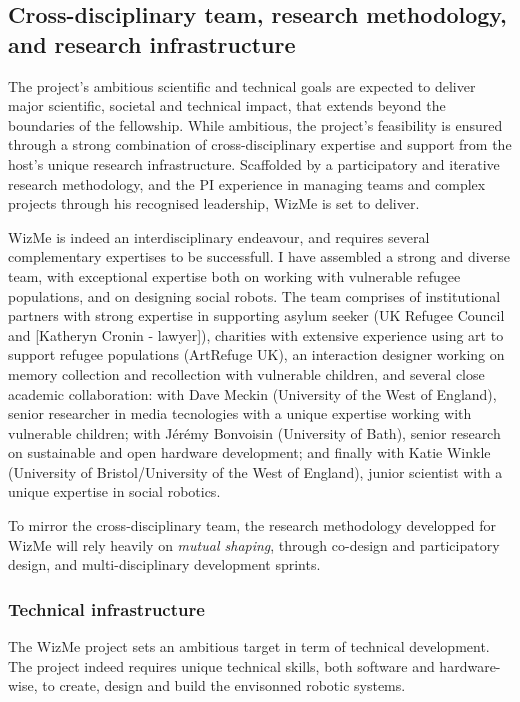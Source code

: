 \documentclass[]{article}
\newcommand{\project}{WizMe\xspace}
\begin{document}
\subsection{Cross-disciplinary team, research methodology, and research
infrastructure}

The project's ambitious scientific and technical goals are expected to deliver
major scientific, societal and technical impact, that extends beyond the
boundaries of the fellowship. While ambitious, the project's feasibility is
ensured through a strong combination of cross-disciplinary expertise and
support from the host's unique research infrastructure. Scaffolded by a
participatory and iterative research methodology, and the PI experience in
managing teams and complex projects through his recognised leadership, \project
is set to deliver.

\project is indeed an interdisciplinary endeavour, and requires several
complementary expertises to be successfull. I have assembled a strong and
diverse team, with exceptional expertise both on working with vulnerable refugee
populations, and on designing social robots. The team comprises of institutional
partners with strong expertise in supporting asylum seeker (UK Refugee Council
and [Katheryn Cronin - lawyer]), charities with extensive experience using art
to support refugee populations (ArtRefuge UK), an interaction designer working
on memory collection and recollection with vulnerable children, and several
close academic collaboration: with Dave Meckin (University of the West of
England), senior researcher in media tecnologies with a unique expertise working
with vulnerable children; with Jérémy Bonvoisin (University of Bath), senior
research on sustainable and open hardware development; and finally with Katie
Winkle (University of Bristol/University of the West of England), junior
scientist with a unique expertise in social robotics.

To mirror the cross-disciplinary team, the research methodology developped for
\project will rely heavily on \emph{mutual shaping}, through co-design and
participatory design, and multi-disciplinary development sprints.

\subsubsection{Technical infrastructure}

The \project project sets an ambitious target in term of technical development.
The project indeed requires unique technical skills, both software and
hardware-wise, to create, design and build the envisonned robotic systems.
\end{document}
